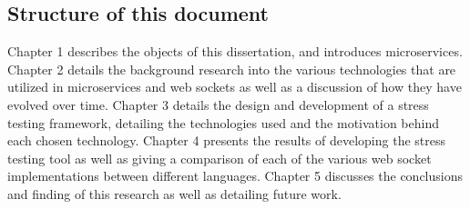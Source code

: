 \subsection{Structure of this document}

Chapter 1 describes the objects of this dissertation, and introduces microservices. Chapter 2 details the background research into the various technologies that are utilized in microservices and web sockets as well as a discussion of how they have evolved over time. Chapter 3 details the design and development of a stress testing framework, detailing the technologies used and the motivation behind each chosen technology. Chapter 4 presents the results of developing the stress testing tool as well as giving a comparison of each of the various web socket implementations between different languages. Chapter 5 discusses the conclusions and finding of this research as well as detailing future work.